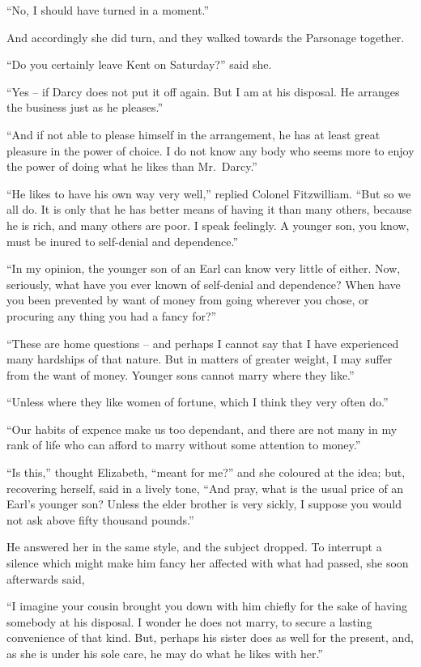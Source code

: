 “No, I should have turned in a moment.”

And accordingly she did turn, and they walked towards
the Parsonage together.

“Do you certainly leave Kent on Saturday?” said she.

“Yes -- if Darcy does not put it off again. But I am
at his disposal. He arranges the business just as he
pleases.”

“And if not able to please himself in the arrangement,
he has at least great pleasure in the power of choice. I do
not know any body who seems more to enjoy the power
of doing what he likes than Mr.\ Darcy.”

“He likes to have his own way very well,” replied
Colonel Fitzwilliam. “But so we all do. It is only that
he has better means of having it than many others,
because he is rich, and many others are poor. I speak
feelingly. A younger son, you know, must be inured to
self-denial and dependence.”

“In my opinion, the younger son of an Earl can know
very little of either. Now, seriously, what have you ever
known of self-denial and dependence? When have you
been prevented by want of money from going wherever
you chose, or procuring any thing you had a fancy for?”

“These are home questions -- and perhaps I cannot say
that I have experienced many hardships of that nature.
But in matters of greater weight, I may suffer from the
want of money. Younger sons cannot marry where they
like.”

“Unless where they like women of fortune, which I think
they very often do.”

“Our habits of expence make us too dependant, and
there are not many in my rank of life who can afford to
marry without some attention to money.”

“Is this,” thought Elizabeth, “meant for me?” and
she coloured at the idea; but, recovering herself, said
in a lively tone, “And pray, what is the usual price of an
Earl’s younger son? Unless the elder brother is very
sickly, I suppose you would not ask above fifty thousand
pounds.”

He answered her in the same style, and the subject
dropped. To interrupt a silence which might make him
fancy her affected with what had passed, she soon afterwards
said,

“I imagine your cousin brought you down with him
chiefly for the sake of having somebody at his disposal.
I wonder he does not marry, to secure a lasting convenience
of that kind. But, perhaps his sister does as
well for the present, and, as she is under his sole care,
he may do what he likes with her.”

